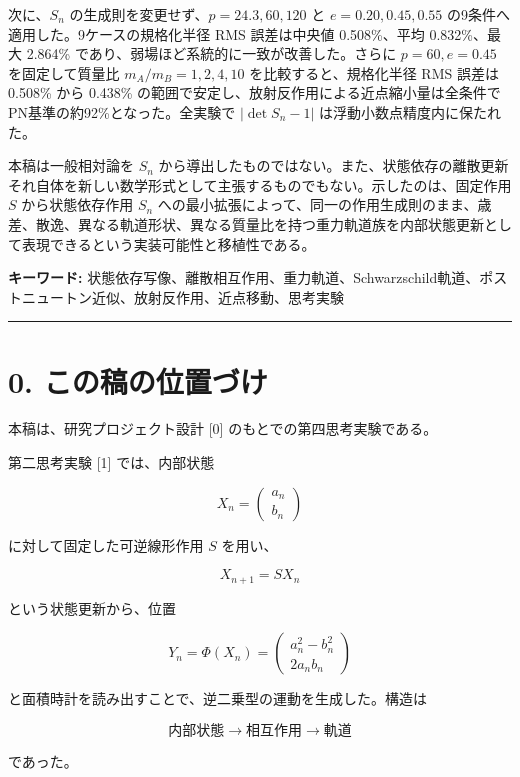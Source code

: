 \documentclass[
  a4paper,
]{ltjsarticle}
\begin{document}
次に、\(S_n\) の生成則を変更せず、\(p=24.3,60,120\) と
\(e=0.20,0.45,0.55\) の9条件へ適用した。9ケースの規格化半径 RMS
誤差は中央値 0.508\%、平均 0.832\%、最大 2.864\%
であり、弱場ほど系統的に一致が改善した。さらに \(p=60,e=0.45\)
を固定して質量比 \(m_A/m_B=1,2,4,10\) を比較すると、規格化半径 RMS
誤差は 0.508\% から 0.438\%
の範囲で安定し、放射反作用による近点縮小量は全条件でPN基準の約92\%となった。全実験で
\(|\det S_n-1|\) は浮動小数点精度内に保たれた。

本稿は一般相対論を \(S_n\)
から導出したものではない。また、状態依存の離散更新それ自体を新しい数学形式として主張するものでもない。示したのは、固定作用
\(S\) から状態依存作用 \(S_n\)
への最小拡張によって、同一の作用生成則のまま、歳差、散逸、異なる軌道形状、異なる質量比を持つ重力軌道族を内部状態更新として表現できるという実装可能性と移植性である。

\textbf{キーワード:}
状態依存写像、離散相互作用、重力軌道、Schwarzschild軌道、ポストニュートン近似、放射反作用、近点移動、思考実験

\begin{center}\rule{0.5\linewidth}{0.5pt}\end{center}

\section{0.
この稿の位置づけ}\label{ux3053ux306eux7a3fux306eux4f4dux7f6eux3065ux3051}

本稿は、研究プロジェクト設計 {[}0{]} のもとでの第四思考実験である。

第二思考実験 {[}1{]} では、内部状態

\[
X_n=\begin{pmatrix}a_n\\b_n\end{pmatrix}
\]

に対して固定した可逆線形作用 \(S\) を用い、

\[
X_{n+1}=SX_n
\]

という状態更新から、位置

\[
Y_n=\Phi(X_n)
=\begin{pmatrix}
a_n^2-b_n^2\\
2a_nb_n
\end{pmatrix}
\]

と面積時計を読み出すことで、逆二乗型の運動を生成した。構造は

\[
\boxed{
\text{内部状態}
\rightarrow
\text{相互作用}
\rightarrow
\text{軌道}
}
\]

であった。
\end{document}
